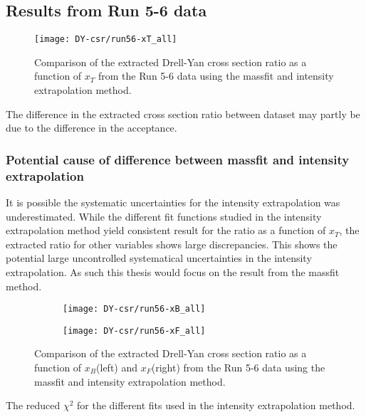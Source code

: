 \documentclass[../main.tex]{subfiles}
\begin{document}
\subsection{Results from Run 5-6 data}

\begin{figure}[h!]
	\centering
	\texttt{[image: DY-csr/run56-xT\_all]}
	\caption{Comparison of the extracted Drell-Yan cross section ratio as a function of $x_T$ from the 
		Run 5-6 data using the massfit and intensity extrapolation method.}
	\label{fig:CSR_Run5-6}
\end{figure}

The difference in the extracted cross section ratio between dataset may partly be due to
the difference in the acceptance. 


\subsubsection{Potential cause of difference between massfit and intensity extrapolation}
It is possible the systematic uncertainties for the intensity extrapolation was
underestimated. While the different fit functions studied in the intensity extrapolation
method yield consistent result for the ratio as a function of $x_T$,
the extracted ratio for other variables shows large discrepancies. This shows the potential 
large uncontrolled systematical uncertainties in the intensity extrapolation. As such this
thesis would focus on the result from the massfit method.

\begin{figure}[h!]
	\centering
	\begin{subfigure}{0.45\linewidth}
		\texttt{[image: DY-csr/run56-xB\_all]}
	\end{subfigure}
	\begin{subfigure}{0.45\linewidth}
		\texttt{[image: DY-csr/run56-xF\_all]}
	\end{subfigure}
	\caption{Comparison of the extracted Drell-Yan cross section ratio as a function of $x_B$(left) 
	and $x_F$(right) from the Run 5-6 data using the massfit and intensity extrapolation method.}
	\label{fig:CSR_Run5-6_xBxF}
\end{figure}

\begin{table}
\centering
\caption{The reduced $\chi^2$ for the different fits used in the intensity extrapolation method. }

\end{table}
\end{document}
